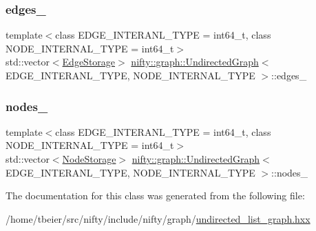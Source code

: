 \subsubsection{\texorpdfstring{edges\+\_\+}{edges\_}}
{\footnotesize\ttfamily template$<$class E\+D\+G\+E\+\_\+\+I\+N\+T\+E\+R\+A\+N\+L\+\_\+\+T\+Y\+PE = int64\+\_\+t, class N\+O\+D\+E\+\_\+\+I\+N\+T\+E\+R\+N\+A\+L\+\_\+\+T\+Y\+PE = int64\+\_\+t$>$ \\
std\+::vector$<$\hyperlink{classnifty_1_1graph_1_1UndirectedGraph_a77256cc943f931180bf84b14d943f39a}{Edge\+Storage}$>$ \hyperlink{classnifty_1_1graph_1_1UndirectedGraph}{nifty\+::graph\+::\+Undirected\+Graph}$<$ E\+D\+G\+E\+\_\+\+I\+N\+T\+E\+R\+A\+N\+L\+\_\+\+T\+Y\+PE, N\+O\+D\+E\+\_\+\+I\+N\+T\+E\+R\+N\+A\+L\+\_\+\+T\+Y\+PE $>$\+::edges\+\_\+\hspace{0.3cm}{\ttfamily [protected]}}

\mbox{\label{classnifty_1_1graph_1_1UndirectedGraph_a4e12e37bede71b7beaca9fdbc7dd9abc}} 
\subsubsection{\texorpdfstring{nodes\+\_\+}{nodes\_}}
{\footnotesize\ttfamily template$<$class E\+D\+G\+E\+\_\+\+I\+N\+T\+E\+R\+A\+N\+L\+\_\+\+T\+Y\+PE = int64\+\_\+t, class N\+O\+D\+E\+\_\+\+I\+N\+T\+E\+R\+N\+A\+L\+\_\+\+T\+Y\+PE = int64\+\_\+t$>$ \\
std\+::vector$<$\hyperlink{classnifty_1_1graph_1_1UndirectedGraph_a6e9a6dd89601d6f9039492053dc9f2a8}{Node\+Storage}$>$ \hyperlink{classnifty_1_1graph_1_1UndirectedGraph}{nifty\+::graph\+::\+Undirected\+Graph}$<$ E\+D\+G\+E\+\_\+\+I\+N\+T\+E\+R\+A\+N\+L\+\_\+\+T\+Y\+PE, N\+O\+D\+E\+\_\+\+I\+N\+T\+E\+R\+N\+A\+L\+\_\+\+T\+Y\+PE $>$\+::nodes\+\_\+\hspace{0.3cm}{\ttfamily [protected]}}



The documentation for this class was generated from the following file\+:\begin{DoxyCompactItemize}
\item 
/home/tbeier/src/nifty/include/nifty/graph/\hyperlink{graph_2undirected__list__graph_8hxx}{undirected\+\_\+list\+\_\+graph.\+hxx}\end{DoxyCompactItemize}
